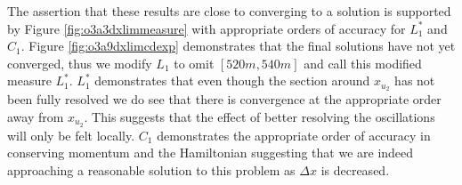 \documentclass[SingleSpace,12pt,Proceedings]{Serre_ASCE}
\begin{document}
The assertion that these results are close to converging to a solution is supported by Figure \ref{fig:o3a3dxlimmeasure} with appropriate orders of accuracy for $L^*_1$ and $C_1$. Figure \ref{fig:o3a9dxlimcdexp} demonstrates that the final solutions have not yet converged, thus we modify $L_1$ to omit $[520m,540m]$ and call this modified measure $L^*_1$. $L^*_1$ demonstrates that even though the section around $x_{u_2}$ has not been fully resolved we do see that there is convergence at the appropriate order away from $x_{u_2}$. This suggests that the effect of better resolving the oscillations will only be felt locally. $C_1$ demonstrates the appropriate order of accuracy in conserving momentum and the Hamiltonian suggesting that we are indeed approaching a reasonable solution to this problem as $\Delta x$ is decreased. 
\end{document}
